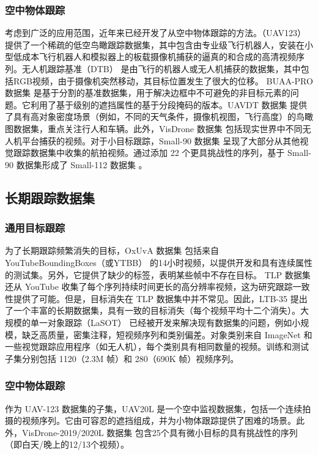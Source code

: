 \subsubsection{空中物体跟踪}
考虑到广泛的应用范围，近年来已经开发了从空中物体跟踪的方法。（UAV123）\cite{mueller2016benchmark} 提供了一个稀疏的低空鸟瞰跟踪数据集，其中包含由专业级飞行机器人，安装在小型低成本飞行机器人和模拟器上的板载摄像机捕获的逼真的和合成的高清视频序列。无人机跟踪基准（DTB）\cite{DTB} 是由飞行的机器人或无人机捕获的数据集，其中包括RGB视频，由于摄像机突然移动，其目标位置发生了很大的位移。 BUAA-PRO 数据集 \cite{BUAA-PRO} 是基于分割的基准数据集，用于解决边框中不可避免的非目标元素的问题。它利用了基于级别的遮挡属性的基于分段掩码的版本。UAVDT 数据集 \cite{UAVDT} 提供了具有高对象密度场景（例如，不同的天气条件，摄像机视图，飞行高度）的鸟瞰图数据集，重点关注行人和车辆。此外，VisDrone 数据集 \cite{VisDrone} 包括现实世界中不同无人机平台捕获的视频。对于小目标跟踪，Small-90 数据集 \cite{Small} 呈现了大部分从其他视觉跟踪数据集中收集的航拍视频。通过添加 22 个更具挑战性的序列，基于 Small-90 数据集形成了 Small-112 数据集 \cite{Small}。 
\subsection{长期跟踪数据集}
\subsubsection{通用目标跟踪}
为了长期跟踪频繁消失的目标，OxUvA 数据集 \cite{OxUvA} 包括来自 YouTubeBoundingBoxes（或YTBB）\cite{YTBB} 的14小时视频，以提供开发和具有连续属性的测试集。另外，它提供了缺少的标签，表明某些帧中不存在目标。 TLP 数据集 \cite{TLP} 还从 YouTube 收集了每个序列持续时间更长的高分辨率视频，这为研究跟踪一致性提供了可能。但是，目标消失在 TLP 数据集中并不常见。因此，LTB-35 \cite{LTB} 提出了一个丰富的长期数据集，具有一致的目标消失（每个视频平均十二个消失）。大规模的单一对象跟踪（LaSOT）\cite{LaSOT} 已经被开发来解决现有数据集的问题，例如小规模，缺乏高质量，密集注释，短视频序列和类别偏差。对象类别来自 ImageNet 和一些视觉跟踪应用程序（如无人机），每个类别具有相同数量的视频。训练和测试子集分别包括 1120（2.3M 帧）和 280（690K 帧）视频序列。
\subsubsection{空中物体跟踪}
作为 UAV-123 数据集的子集，UAV20L 是一个空中监视数据集，包括一个连续拍摄的视频序列。它由可容忍的遮挡组成，并为小物体跟踪提供了困难的场景。此外，VisDrone-2019/2020L 数据集 \cite{VisDrone} 包含25个具有微小目标的具有挑战性的序列（即白天/晚上的12/13个视频）。%

